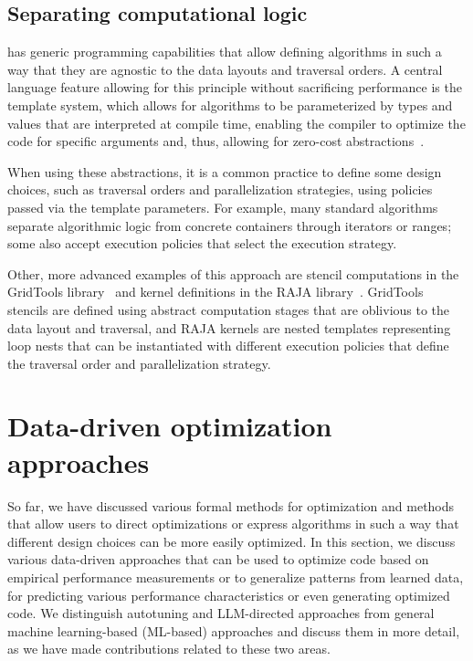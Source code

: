 \subsection{Separating computational logic}\label{sec:separating-computational-logic}


\cpp has generic programming capabilities that allow defining algorithms in such a way that they are agnostic to the data layouts and traversal orders. A central language feature allowing for this principle without sacrificing performance is the template system, which allows for algorithms to be parameterized by types and values that are interpreted at compile time, enabling the compiler to optimize the code for specific arguments and, thus, allowing for zero-cost abstractions~\cite{stroustrup2012foundations}.

When using these abstractions, it is a common practice to define some design choices, such as traversal orders and parallelization strategies, using policies passed via the template parameters. For example, many standard \cpp algorithms separate algorithmic logic from concrete containers through iterators or ranges; some also accept execution policies that select the execution strategy.

Other, more advanced examples of this approach are stencil computations in the GridTools library~\cite{afanasyev2021gridtools} and kernel definitions in the RAJA library~\cite{beckingsale2019raja}. GridTools stencils are defined using abstract computation stages that are oblivious to the data layout and traversal, and RAJA kernels are nested templates representing loop nests that can be instantiated with different execution policies that define the traversal order and parallelization strategy.


\section{Data-driven optimization approaches}\label{sec:soft-computing-approaches}

So far, we have discussed various formal methods for optimization and methods that allow users to direct optimizations or express algorithms in such a way that different design choices can be more easily optimized. In this section, we discuss various data-driven approaches that can be used to optimize code based on empirical performance measurements or to generalize patterns from learned data, for predicting various performance characteristics or even generating optimized code. We distinguish autotuning and LLM-directed approaches from general machine learning-based (ML-based) approaches and discuss them in more detail, as we have made contributions related to these two areas.


